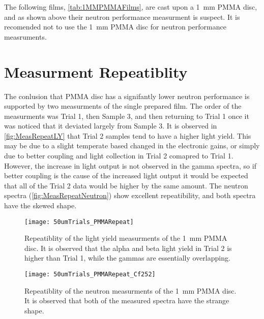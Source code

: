 \documentclass[draftcls,onecolumn]{IEEEtran}
\begin{document}
The following films, \autoref{tab:1MMPMMAFilms}, are cast upon a \SI{1}{\mm} PMMA disc, and as shown above their neutron performance measurment is suspect.
It is recomended not to use the \SI{1}{\mm} PMMA disc for neutron performance measruments.
\pagebreak
\appendices
\section{Measurment Repeatiblity}
\label{sec:MeasRepeat}
The conlusion that PMMA disc has a signifantly lower neutron performance is supported by two measurments of the single prepared film.
The order of the measurments was Trial 1, then Sample 3, and then returning to Trial 1 once it was noticed that it deviated largely from Sample 3.
It is observed in \autoref{fig:MeasRepeatLY} that Trial 2 samples tend to have a higher light yield. 
This may be due to a slight temperate based changed in the electronic gains, or simply due to better coupling and light collection in Trial 2 comapred to Trial 1.
However, the increase in light output is not observed in the gamma spectra, so if better coupling is the cause of the increased light output it would be expected that all of the Trial 2 data would be higher by the same amount.
The neutron spectra (\autoref{fig:MeasRepeatNeutron}) show excellent repeatibility, and both spectra have the skewed shape.
\begin{figure}
  \centering
  \texttt{[image: 50umTrials\_PMMARepeat]}
  \caption[PMMA Light Yield Repeatiblity]{Repeatiblity of the light yield measurments of the \SI{1}{\mm} PMMA disc. It is observed that the alpha and beta light yield in Trial 2 is higher than Trial 1, while the gammas are essentially overlapping.}
  \label{fig:MeasRepeatLY}
\end{figure}
\begin{figure}
  \centering
  \texttt{[image: 50umTrials\_PMMARepeat\_Cf252]}
  \caption[PMMA Neutron Repeatiblity]{Repeatiblity of the neutron measurments of the \SI{1}{\mm} PMMA disc. It is observed that both of the measured spectra have the strange shape.}
  \label{fig:MeasRepeatNeutron}
\end{figure}
\end{document}
